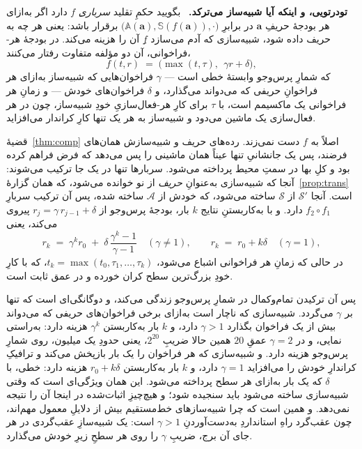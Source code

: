 \documentclass[10pt,oneside,openany]{book}
\newcommand{\Adv}{\mathcal{A}}
\newcommand{\Sim}{\mathcal{S}}
\newcommand{\bd}[1]{\mathbf{#1}}
\newcommand{\Aset}{\mathbb{A}}
\newcommand{\SimSet}{\mathbb{S}}
\newcommand{\heading}[1]{\medskip\par\noindent\textcolor{accent}{\textbf{#1.}}\ }
\theoremstyle{accentdef}
\theoremstyle{accentplain}
\begin{document}
\heading{تو‌درتویی، و اینکه آیا شبیه‌ساز می‌ترکد} بگویید حکمِ تقلید
\emph{سرباری}ِ $f$ دارد اگر به‌ازای هر بودجهٔ حریفِ $\bd{a}$ در برابرِ
$\bigl(\Aset(\bd{a}),\SimSet(f(\bd{a})),\cdot\bigr)$ برقرار باشد: یعنی هر
چه به حریف داده شود، شبیه‌سازی که آدم می‌سازد $f$ِ آن را هزینه می‌کند. در
بودجهٔ هر-فراخوانی، آن دو مؤلفه متفاوت رفتار می‌کنند،
\[
  f(t,r) \;=\; \bigl(\max(t,\tau),\ \ \gamma r + \delta\bigr) ,
\]
که شمارِ پرس‌وجو وابستهٔ خطی است --- $\gamma$ فراخوان‌هایی که شبیه‌ساز به‌ازای
هر فراخوانِ حریفی که می‌دواند می‌گذارد، و $\delta$ فراخوان‌های خودش --- و
زمانِ هر فراخوانی یک ماکسیمم است، با $\tau$ برای کارِ هر-فعال‌سازیِ خودِ
شبیه‌ساز، چون در هر فعال‌سازی یک ماشین می‌دود و شبیه‌ساز به هر یک تنها کارِ
کراندار می‌افزاید.

قضیهٔ~\ref{thm:comp} اصلاً به $f$ دست نمی‌زند. رده‌های حریف و شبیه‌سازش
همان‌های فرضند، پس یک جانشانیِ تنها عیناً همان ماشینی را پس می‌دهد که فرض
فراهم کرده بود و کلِ بها در سمتِ محیط پرداخته می‌شود. سربارها تنها در یک جا
ترکیب می‌شوند: آنجا که شبیه‌سازی به‌عنوانِ \emph{حریف} از نو خوانده می‌شود،
که همان گزارهٔ~\ref{prop:trans} است. آنجا $\Sim'$ از $\Sim$ ساخته می‌شود، که
خودش از $\Adv$ ساخته شده، پس آن ترکیب سربارِ $f_2 \circ f_1$ دارد. و با
به‌کاربستنِ نتایج $k$ بار، بودجهٔ پرس‌وجو از $r_j = \gamma\, r_{j-1} +
\delta$ پیروی می‌کند، یعنی
\[
  r_k \;=\; \gamma^{k} r_0 \;+\; \delta\,\frac{\gamma^{k}-1}{\gamma-1}
  \quad (\gamma \neq 1),
  \qquad
  r_k \;=\; r_0 + k\delta \quad (\gamma = 1) ,
\]
در حالی که زمانِ هر فراخوانی اشباع می‌شود، $t_k = \max(t_0, \tau_1, \dots,
\tau_k)$، که با کارِ خودِ بزرگ‌ترین سطح کران خورده و در عمق ثابت است.

پس آن ترکیدن تمام‌وکمال در شمارِ پرس‌وجو زندگی می‌کند، و دوگانگی‌ای است که
تنها بر $\gamma$ می‌گردد. شبیه‌سازی که ناچار است به‌ازای برخی فراخوان‌های
حریفی که می‌دواند بیش از یک فراخوان بگذارد $\gamma > 1$ دارد، و $k$ بار
به‌کاربستن $\gamma^k$ هزینه دارد: به‌راستی نمایی، و در $\gamma = 2$ عمقِ
$20$ همین حالا ضریبِ $2^{20}$، یعنی حدودِ یک میلیون، روی شمارِ پرس‌وجو
هزینه دارد. و شبیه‌سازی که هر فراخوان را یک بار بازپخش می‌کند و ترافیکِ
کراندارِ خودش را می‌افزاید $\gamma = 1$ دارد، و $k$ بار به‌کاربستن $r_0 +
k\delta$ هزینه دارد: خطی، با $\delta$ که یک بار به‌ازای هر سطح پرداخته
می‌شود. این همان ویژگی‌ای است که وقتی شبیه‌سازی ساخته می‌شود باید سنجیده
شود؛ و هیچ‌چیزِ اثبات‌شده در اینجا آن را نتیجه نمی‌دهد. و همین است که چرا
شبیه‌سازهای خط‌مستقیم بیش از دلایلِ معمول مهم‌اند، چون عقب‌گرد راهِ
استانداردِ به‌دست‌آوردنِ $\gamma > 1$ است: یک شبیه‌سازِ عقب‌گردی در هر جای
آن برج، ضریبِ $\gamma$ را روی هر سطحِ زیرِ خودش می‌گذارد.
\end{document}
